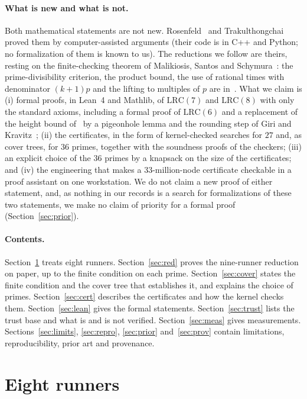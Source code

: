 \documentclass[11pt]{article}
\theoremstyle{remark}
\begin{document}
\paragraph{What is new and what is not.} Both mathematical statements are not new. Rosenfeld~\cite{Ros8,Ros9} and Trakulthongchai~\cite{Tra} proved them by computer-assisted arguments (their code is in C++ and Python; no formalization of them is known to us). The reductions we follow are theirs, resting on the finite-checking theorem of Malikiosis, Santos and Schymura~\cite{MSS}: the prime-divisibility criterion, the product bound, the use of rational times with denominator $(k+1)p$ and the lifting to multiples of $p$ are in~\cite{Ros8,Tra,ST}. What we claim is (i) formal proofs, in Lean~4 and Mathlib, of $\mathrm{LRC}(7)$ and $\mathrm{LRC}(8)$ with only the standard axioms, including a formal proof of $\mathrm{LRC}(6)$ and a replacement of the height bound of~\cite{MSS} by a pigeonhole lemma and the rounding step of Giri and Kravitz~\cite{GK}; (ii) the certificates, in the form of kernel-checked searches for $27$ and, as cover trees, for $36$ primes, together with the soundness proofs of the checkers; (iii) an explicit choice of the $36$ primes by a knapsack on the size of the certificates; and (iv) the engineering that makes a $33$-million-node certificate checkable in a proof assistant on one workstation. We do not claim a new proof of either statement, and, as nothing in our records is a search for formalizations of these two statements, we make no claim of priority for a formal proof (Section~\ref{sec:prior}).

\paragraph{Contents.} Section~\ref{sec:eight} treats eight runners. Section~\ref{sec:red} proves the nine-runner reduction on paper, up to the finite condition on each prime. Section~\ref{sec:cover} states the finite condition and the cover tree that establishes it, and explains the choice of primes. Section~\ref{sec:cert} describes the certificates and how the kernel checks them. Section~\ref{sec:lean} gives the formal statements. Section~\ref{sec:trust} lists the trust base and what is and is not verified. Section~\ref{sec:meas} gives measurements. Sections~\ref{sec:limits}, \ref{sec:repro}, \ref{sec:prior} and~\ref{sec:prov} contain limitations, reproducibility, prior art and provenance.

\section{Eight runners}\label{sec:eight}
\end{document}

